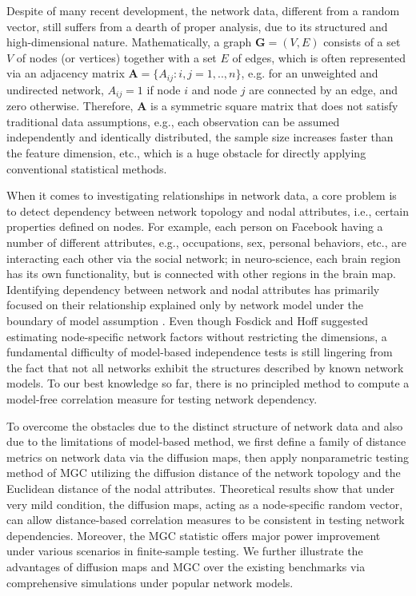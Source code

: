\documentclass[11pt]{article}
\theoremstyle{definition}
\begin{document}
Despite of many recent development, the network data, different from a random vector, still suffers from a dearth of proper analysis, due to its structured and high-dimensional nature. Mathematically, a graph $\mathbf{G}=(V,E)$ consists of a set $V$ of nodes (or vertices) together with a set $E$ of edges, which is often represented via an adjacency matrix $\mathbf{A} = \{A_{ij} : i,j= 1,..,n \}$, e.g. for an unweighted and undirected network, $A_{ij} = 1$ if node $i$ and node $j$ are connected by an edge, and zero otherwise. Therefore, $\mathbf{A}$ is a symmetric square matrix that does not satisfy traditional data assumptions, e.g., each observation can be assumed independently and identically distributed, the sample size increases faster than the feature dimension, etc., which is a huge obstacle for directly applying conventional statistical methods. 

When it comes to investigating relationships in network data, a core problem is to detect dependency between network topology and nodal attributes, i.e., certain properties defined on nodes. For example, each person on Facebook having a number of different attributes, e.g., occupations, sex, personal behaviors, etc., are interacting each other via the social network; in neuro-science, each brain region has its own functionality, but is connected with other regions in the brain map. Identifying dependency between network and nodal attributes has primarily focused on their relationship explained only by network model under the boundary of model assumption \citep{wasserman1996logit, howard2016understanding, fosdick2015testing}. Even though Fosdick and Hoff \cite{fosdick2015testing} suggested estimating node-specific network factors without restricting the dimensions, a fundamental difficulty of model-based independence tests is still lingering from the fact that not all networks exhibit the structures described by known network models. To our best knowledge so far, there is no principled method to compute a model-free correlation measure for testing network dependency. 

To overcome the obstacles due to the distinct structure of network data and also due to the limitations of model-based method, we first define a family of distance metrics on network data via the diffusion maps, then apply nonparametric testing method of MGC utilizing the diffusion distance of the network topology and the Euclidean distance of the nodal attributes. Theoretical results show that under very mild condition, the diffusion maps, acting as a node-specific random vector, can allow distance-based correlation measures to be consistent in testing network dependencies. Moreover, the MGC statistic offers major power improvement under various scenarios in finite-sample testing. We further illustrate the advantages of diffusion maps and MGC over the existing benchmarks via comprehensive simulations under popular network models.
\end{document}
